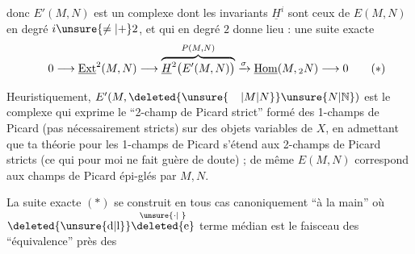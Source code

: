 
donc $E'(M,N)$ est un complexe dont les invariants $\underline{H}^{i}$ sont ceux de $E(M,N)$ en degré $i\unsure{\ne|+}2$, et qui en degré $2$ donne lieu : une suite exacte
\[
0\longrightarrow\underline{\mathrm{Ext}}^{2}(M,N)\longrightarrow
\overbrace{\underline{H}^{2}\bigl(E'(M,N)\bigr)}^{P(M,N)}
\xrightarrow{\sigma}\underline{\mathrm{Hom}}(M,{}_{2}N)\longrightarrow 0
\tag*{\makebox[0pt][r]{\makebox[\displaywidth][l]{$(*)$}}}
\]

Heuristiquement, $E'(M,\deleted{\unsure{\phantom{M}|M|N}}\unsure{N|\mathbb{N}})$ est le complexe qui exprime le ``2-champ de Picard strict'' formé des 1-champs de Picard (pas nécessairement stricts)  sur des objets variables de $X$, en admettant que ta théorie pour les 1-champs de Picard  s'étend aux 2-champs de Picard stricts (ce qui pour moi ne fait guère de doute) ; de même $E(M,N)$ correspond aux champs de Picard  épi-glés par $M,N$.

La suite exacte $(*)$ se construit en tous cas canoniquement ``à la main''\unsure{,|)} où $\deleted{\unsure{\mathrm{d}|\mathrm{l}}}\overset{\unsure{\cdot|\phantom{\cdot}}}{\deleted{\mathrm{e}}}$ terme médian est le faisceau des    ``équivalence'' près des


